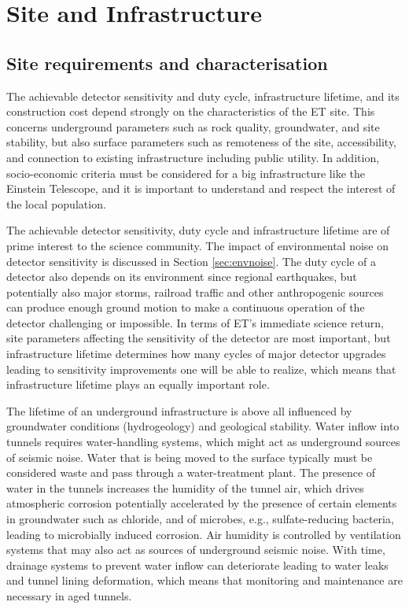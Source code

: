 \section{Site and Infrastructure}
\label{chap:Site}

\subsection{Site requirements and characterisation}
\label{SiteReq}
The achievable detector sensitivity and duty cycle, infrastructure lifetime, and its construction cost depend strongly on the characteristics of the ET site. This concerns underground parameters such as rock quality, groundwater, and site stability, but also surface parameters such as remoteness of the site, accessibility, and connection to existing infrastructure including public utility. In addition, socio-economic criteria must be considered for a big infrastructure like the Einstein Telescope, and it is important to understand and respect the interest of the local population. 

The achievable detector sensitivity, duty cycle and infrastructure lifetime are of prime interest to the science community. The impact of environmental noise on detector sensitivity is discussed in Section \ref{sec:envnoise}. The duty cycle of a detector also depends on its environment since regional earthquakes, but potentially also major storms, railroad traffic and other anthropogenic sources can produce enough ground motion to make a continuous operation of the detector challenging or impossible. In terms of ET's immediate science return, site parameters affecting the sensitivity of the detector are most important, but infrastructure lifetime determines how many cycles of major detector upgrades leading to sensitivity improvements one will be able to realize, which means that infrastructure lifetime plays an equally important role. 

The lifetime of an underground infrastructure is above all influenced by groundwater conditions (hydrogeology) and geological stability. Water inflow into tunnels requires water-handling systems, which might act as underground sources of seismic noise. Water that is being moved to the surface typically must be considered waste and pass through a water-treatment plant. The presence of water in the tunnels increases the humidity of the tunnel air, which drives atmospheric corrosion potentially accelerated by the presence of certain elements in groundwater such as chloride, and of microbes, e.g., sulfate-reducing bacteria, leading to microbially induced corrosion. Air humidity is controlled by ventilation systems that may also act as sources of underground seismic noise. With time, drainage systems to prevent water inflow can deteriorate leading to water leaks and tunnel lining deformation, which means that monitoring and maintenance are necessary in aged tunnels. 

